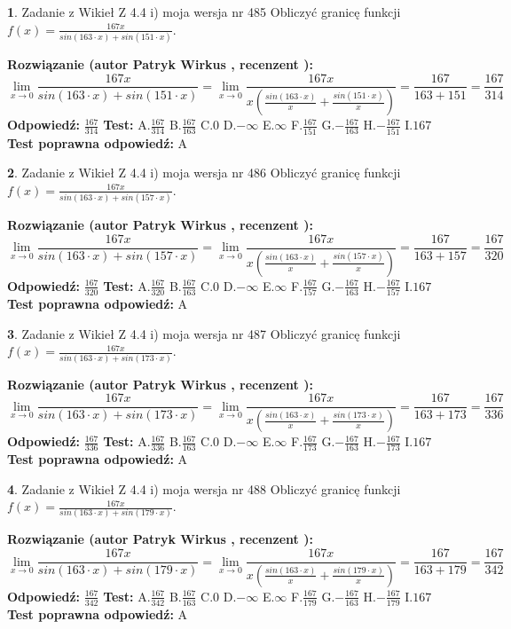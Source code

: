 \documentclass[12pt, a4paper]{article}
\theoremstyle{definition} %
\newtheorem{zad}{}
\newcommand{\zadStart}[1]{\begin{zad}#1\newline}
\newcommand{\zadStop}{\end{zad}}
\newcommand{\rozwStart}[2]{\noindent \textbf{Rozwiązanie (autor #1 , recenzent #2): }\newline}
\newcommand{\rozwStop}{\newline}
\newcommand{\odpStart}{\noindent \textbf{Odpowiedź:}\newline}
\newcommand{\odpStop}{\newline}
\newcommand{\testStart}{\noindent \textbf{Test:}\newline}
\newcommand{\testStop}{\newline}
\newcommand{\kluczStart}{\noindent \textbf{Test poprawna odpowiedź:}\newline}
\newcommand{\kluczStop}{\newline}
\begin{document}
\zadStart{Zadanie z Wikieł Z 4.4 i) moja wersja nr 485}
Obliczyć granicę funkcji $f(x)=\frac{167x}{sin(163\cdot x) +sin(151\cdot x)}$.
\zadStop
\rozwStart{Patryk Wirkus}{}
$$\lim\limits_{x\to 0}\frac{167x}{sin(163\cdot x) +sin(151\cdot x)}=\lim\limits_{x\to 0}\frac{167x}{x(\frac{sin(163\cdot x)}{x}+\frac{sin(151\cdot x)}{x})}=\frac{167}{163+151} = \frac{167}{314}$$
\rozwStop
\odpStart
$\frac{167}{314}$
\odpStop
\testStart
A.$\frac{167}{314}$
B.$\frac{167}{163}$
C.$0$
D.$-\infty$
E.$\infty$
F.$\frac{167}{151}$
G.$-\frac{167}{163}$
H.$-\frac{167}{151}$
I.$167$
\testStop
\kluczStart
A
\kluczStop



\zadStart{Zadanie z Wikieł Z 4.4 i) moja wersja nr 486}
Obliczyć granicę funkcji $f(x)=\frac{167x}{sin(163\cdot x) +sin(157\cdot x)}$.
\zadStop
\rozwStart{Patryk Wirkus}{}
$$\lim\limits_{x\to 0}\frac{167x}{sin(163\cdot x) +sin(157\cdot x)}=\lim\limits_{x\to 0}\frac{167x}{x(\frac{sin(163\cdot x)}{x}+\frac{sin(157\cdot x)}{x})}=\frac{167}{163+157} = \frac{167}{320}$$
\rozwStop
\odpStart
$\frac{167}{320}$
\odpStop
\testStart
A.$\frac{167}{320}$
B.$\frac{167}{163}$
C.$0$
D.$-\infty$
E.$\infty$
F.$\frac{167}{157}$
G.$-\frac{167}{163}$
H.$-\frac{167}{157}$
I.$167$
\testStop
\kluczStart
A
\kluczStop



\zadStart{Zadanie z Wikieł Z 4.4 i) moja wersja nr 487}
Obliczyć granicę funkcji $f(x)=\frac{167x}{sin(163\cdot x) +sin(173\cdot x)}$.
\zadStop
\rozwStart{Patryk Wirkus}{}
$$\lim\limits_{x\to 0}\frac{167x}{sin(163\cdot x) +sin(173\cdot x)}=\lim\limits_{x\to 0}\frac{167x}{x(\frac{sin(163\cdot x)}{x}+\frac{sin(173\cdot x)}{x})}=\frac{167}{163+173} = \frac{167}{336}$$
\rozwStop
\odpStart
$\frac{167}{336}$
\odpStop
\testStart
A.$\frac{167}{336}$
B.$\frac{167}{163}$
C.$0$
D.$-\infty$
E.$\infty$
F.$\frac{167}{173}$
G.$-\frac{167}{163}$
H.$-\frac{167}{173}$
I.$167$
\testStop
\kluczStart
A
\kluczStop



\zadStart{Zadanie z Wikieł Z 4.4 i) moja wersja nr 488}
Obliczyć granicę funkcji $f(x)=\frac{167x}{sin(163\cdot x) +sin(179\cdot x)}$.
\zadStop
\rozwStart{Patryk Wirkus}{}
$$\lim\limits_{x\to 0}\frac{167x}{sin(163\cdot x) +sin(179\cdot x)}=\lim\limits_{x\to 0}\frac{167x}{x(\frac{sin(163\cdot x)}{x}+\frac{sin(179\cdot x)}{x})}=\frac{167}{163+179} = \frac{167}{342}$$
\rozwStop
\odpStart
$\frac{167}{342}$
\odpStop
\testStart
A.$\frac{167}{342}$
B.$\frac{167}{163}$
C.$0$
D.$-\infty$
E.$\infty$
F.$\frac{167}{179}$
G.$-\frac{167}{163}$
H.$-\frac{167}{179}$
I.$167$
\testStop
\kluczStart
A
\kluczStop
\end{document}
